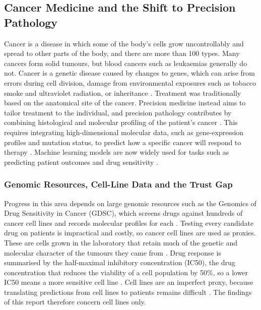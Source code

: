 \subsection{Cancer Medicine and the Shift to Precision Pathology}\label{sec:cancer-medicine}

Cancer is a disease in which some of the body’s cells grow uncontrollably and spread to other parts of the body, and there are more than 100 types. Many cancers form solid tumours, but blood cancers such as leukaemias generally do not. Cancer is a genetic disease caused by changes to genes, which can arise from errors during cell division, damage from environmental exposures such as tobacco smoke and ultraviolet radiation, or inheritance \citep{nci2026}. Treatment was traditionally based on the anatomical site of the cancer. Precision medicine instead aims to tailor treatment to the individual, and precision pathology contributes by combining histological and molecular profiling of the patient’s cancer \citep{klauschen2024}. This requires integrating high-dimensional molecular data, such as gene-expression profiles and mutation status, to predict how a specific cancer will respond to therapy \citep{klauschen2024}. Machine learning models are now widely used for tasks such as predicting patient outcomes and drug sensitivity \citep{baptista2021}.

\subsubsection{Genomic Resources, Cell-Line Data and the Trust Gap}\label{sec:cell-line-trust-gap}

Progress in this area depends on large genomic resources such as the Genomics of Drug Sensitivity in Cancer (GDSC), which screens drugs against hundreds of cancer cell lines and records molecular profiles for each \citep{yang2013,baptista2021}. Testing every candidate drug on patients is impractical and costly, so cancer cell lines are used as proxies. These are cells grown in the laboratory that retain much of the genetic and molecular character of the tumours they came from \citep{yang2013}. Drug response is summarised by the half-maximal inhibitory concentration (IC50), the drug concentration that reduces the viability of a cell population by 50\%, so a lower IC50 means a more sensitive cell line \citep{yang2013}. Cell lines are an imperfect proxy, because translating predictions from cell lines to patients remains difficult \citep{wu2025}. The findings of this report therefore concern cell lines only.

